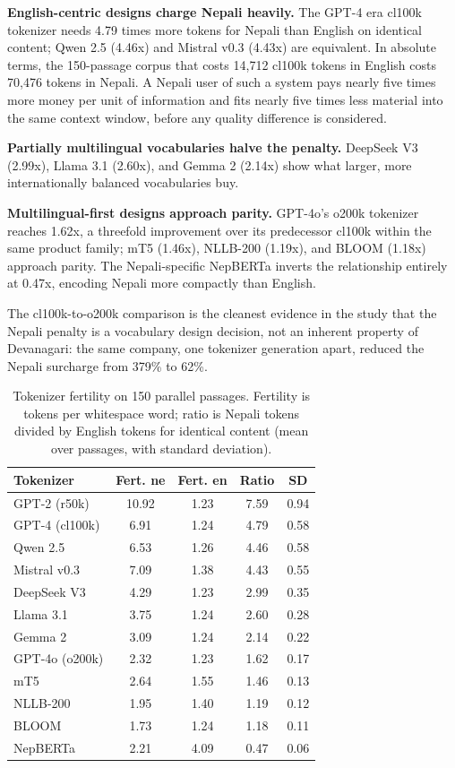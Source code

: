 \documentclass[conference]{IEEEtran}
\begin{document}
\textbf{English-centric designs charge Nepali heavily.} The GPT-4 era cl100k tokenizer needs 4.79 times more tokens for Nepali than English on identical content; Qwen 2.5 (4.46x) and Mistral v0.3 (4.43x) are equivalent. In absolute terms, the 150-passage corpus that costs 14{,}712 cl100k tokens in English costs 70{,}476 tokens in Nepali. A Nepali user of such a system pays nearly five times more money per unit of information and fits nearly five times less material into the same context window, before any quality difference is considered.

\textbf{Partially multilingual vocabularies halve the penalty.} DeepSeek V3 (2.99x), Llama 3.1 (2.60x), and Gemma 2 (2.14x) show what larger, more internationally balanced vocabularies buy.

\textbf{Multilingual-first designs approach parity.} GPT-4o's o200k tokenizer reaches 1.62x, a threefold improvement over its predecessor cl100k within the same product family; mT5 (1.46x), NLLB-200 (1.19x), and BLOOM (1.18x) approach parity. The Nepali-specific NepBERTa inverts the relationship entirely at 0.47x, encoding Nepali more compactly than English.

The cl100k-to-o200k comparison is the cleanest evidence in the study that the Nepali penalty is a vocabulary design decision, not an inherent property of Devanagari: the same company, one tokenizer generation apart, reduced the Nepali surcharge from 379\% to 62\%.

\begin{table}[t]
\caption{Tokenizer fertility on 150 parallel passages. Fertility is tokens per whitespace word; ratio is Nepali tokens divided by English tokens for identical content (mean over passages, with standard deviation).}
\label{tab:tok}
\centering
\small
\begin{tabular}{lcccc}
\toprule
Tokenizer & Fert. ne & Fert. en & Ratio & SD \\
\midrule
GPT-2 (r50k) & 10.92 & 1.23 & 7.59 & 0.94 \\
GPT-4 (cl100k) & 6.91 & 1.24 & 4.79 & 0.58 \\
Qwen 2.5 & 6.53 & 1.26 & 4.46 & 0.58 \\
Mistral v0.3 & 7.09 & 1.38 & 4.43 & 0.55 \\
DeepSeek V3 & 4.29 & 1.23 & 2.99 & 0.35 \\
Llama 3.1 & 3.75 & 1.24 & 2.60 & 0.28 \\
Gemma 2 & 3.09 & 1.24 & 2.14 & 0.22 \\
GPT-4o (o200k) & 2.32 & 1.23 & 1.62 & 0.17 \\
mT5 & 2.64 & 1.55 & 1.46 & 0.13 \\
NLLB-200 & 1.95 & 1.40 & 1.19 & 0.12 \\
BLOOM & 1.73 & 1.24 & 1.18 & 0.11 \\
NepBERTa & 2.21 & 4.09 & 0.47 & 0.06 \\
\bottomrule
\end{tabular}
\end{table}
\end{document}
